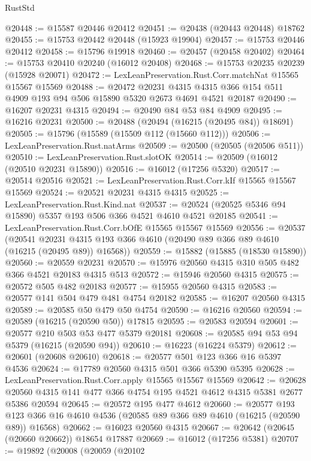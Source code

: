 \begin{lexlean}{RustStd}
\begin{coremodule}
@20448 := @15587 @20446 @20412
@20451 := @20438 (@20443 @20448) @18762
@20455 := @15753 @20442 @20448 (@15923 @19904)
@20457 := @15753 @20446 @20412
@20458 := @15796 @19918
@20460 := @20457 (@20458 @20402)
@20464 := @15753 @20410 @20240 (@16012 @20408)
@20468 := @15753 @20235 @20239 (@15928 @20071)
@20472 := LexLeanPreservation.Rust.Corr.matchNat @15565 @15567 @15569
@20488 := @20472
    @20231
    @4315
    @4315
    @366
    @154
    @511
    @4909
    @193
    @94
    @506
    @15890
    @5320
    @2673
    @4691
    @4521
    @20187
@20490 := @16207 @20231 @4315
@20494 := @20490 @84 @53 @84 @4909
@20495 := @16216 @20231
@20500 := @20488 (@20494 (@16215 (@20495 @84)) @18691)
@20505 := @15796 (@15589 (@15509 @112 (@15660 @112)))
@20506 := LexLeanPreservation.Rust.natArms
@20509 := @20500 (@20505 (@20506 @511))
@20510 := LexLeanPreservation.Rust.slotOK
@20514 := @20509 (@16012 (@20510 @20231 @15890))
@20516 := @16012 (@17256 @5320)
@20517 := @20514 @20516
@20521 := LexLeanPreservation.Rust.Corr.kIf @15565 @15567 @15569
@20524 := @20521 @20231 @4315 @4315
@20525 := LexLeanPreservation.Rust.Kind.nat
@20537 := @20524 (@20525 @5346 @94 @15890) @5357 @193 @506 @366 @4521 @4610 @4521 @20185
@20541 := LexLeanPreservation.Rust.Corr.bOfE @15565 @15567 @15569
@20556 := @20537
    (@20541 @20231 @4315 @193 @366 @4610 (@20490 @89 @366 @89 @4610 (@16215 (@20495 @89)) @16568))
@20559 := @15882 (@15885 (@18530 @15890))
@20560 := @20559 @20231
@20570 := @15976 @20560 @4315 @310 @505 @482 @366 @4521 @20183 @4315 @513
@20572 := @15946 @20560 @4315
@20575 := @20572 @505 @482 @20183
@20577 := @15955 @20560 @4315
@20583 := @20577 @141 @504 @479 @481 @4754 @20182
@20585 := @16207 @20560 @4315
@20589 := @20585 @50 @479 @50 @4754
@20590 := @16216 @20560
@20594 := @20589 (@16215 (@20590 @50)) @17815
@20595 := @20583 @20594
@20601 := @20577 @210 @503 @53 @477 @5379 @20181
@20608 := @20585 @94 @53 @94 @5379 (@16215 (@20590 @94))
@20610 := @16223 (@16224 @5379)
@20612 := @20601 (@20608 @20610)
@20618 := @20577 @501 @123 @366 @16 @5397 @4536
@20624 := @17789 @20560 @4315 @501 @366 @5390 @5395
@20628 := LexLeanPreservation.Rust.Corr.apply @15565 @15567 @15569
@20642 := @20628 @20560 @4315 @141 @477 @366 @4754 @195 @4521 @4612 @4315 @5381 @2677 @5386 @20594
@20645 := @20572 @195 @477 @4612
@20660 := @20577
    @193
    @123
    @366
    @16
    @4610
    @4536
    (@20585 @89 @366 @89 @4610 (@16215 (@20590 @89)) @16568)
@20662 := @16023 @20560 @4315
@20667 := @20642 (@20645 (@20660 @20662)) @18654 @17887
@20669 := @16012 (@17256 @5381)
@20707 := @19892
    (@20008
      (@20059
        (@20102

\end{coremodule}
\end{lexlean}
